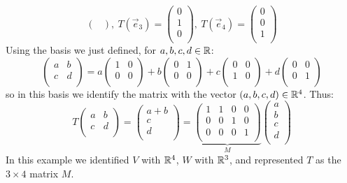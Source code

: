 \documentclass[../main.tex]{subfiles}
\begin{document}
\begin{example}
\[\begin{pmatrix}
    \end{pmatrix},\
    T(\vec{e}_3) = \begin{pmatrix}
    0 \\
    1 \\
    0 \\
    \end{pmatrix},\
    T(\vec{e}_4) = \begin{pmatrix}
    0 \\
    0 \\
    1 \\
    \end{pmatrix}
  \]
  Using the basis we just defined, for $a, b, c, d \in \mathbb{R}$:
  \[
    \begin{pmatrix}
    a & b \\
    c & d \\
    \end{pmatrix} =
    a \begin{pmatrix}
    1 & 0 \\
    0 & 0 \\
    \end{pmatrix} +
    b \begin{pmatrix}
    0 & 1 \\
    0 & 0 \\
    \end{pmatrix} +
    c \begin{pmatrix}
    0 & 0 \\
    1 & 0 \\
    \end{pmatrix} +
    d \begin{pmatrix}
    0 & 0 \\
    0 & 1 \\
    \end{pmatrix}
  \]
  so in this basis we identify the matrix with the vector $(a, b, c, d) \in \mathbb{R}^4$.
  Thus:
  \[
    T\begin{pmatrix}
    a & b \\
    c & d \\
    \end{pmatrix} =
    \begin{pmatrix}
    a + b \\
    c \\
    d \\
    \end{pmatrix} =
    \underbrace{
    \begin{pmatrix}
      1 & 1 & 0 & 0 \\
      0 & 0 & 1 & 0 \\
      0 & 0 & 0 & 1 \\
    \end{pmatrix}}_{M}
    \begin{pmatrix}
    a \\
    b \\
    c \\
    d\\
    \end{pmatrix}
  \]
  In this example we identified $V$ with $\mathbb{R}^{4}$, $W$ with $\mathbb{R}^{3}$, and represented $T$ as the $3\times4$ matrix $M$.
\end{example}
\end{document}
